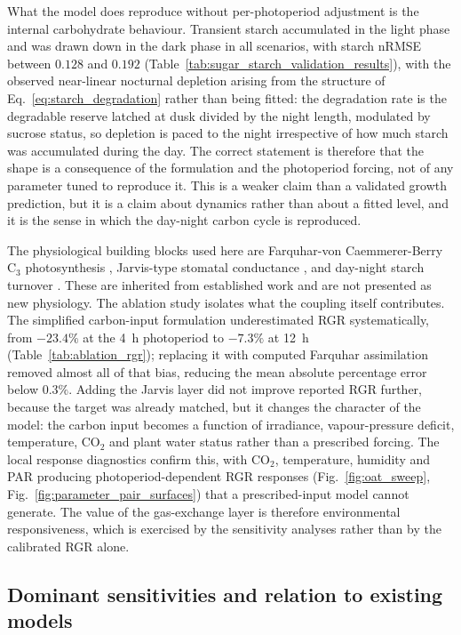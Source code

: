 \documentclass[a4paper,fleqn]{cas-sc}
\begin{document}
What the model does reproduce without per-photoperiod adjustment is the
internal carbohydrate behaviour. Transient starch accumulated in the light
phase and was drawn down in the dark phase in all scenarios, with starch
nRMSE between $0.128$ and $0.192$ (Table~\ref{tab:sugar_starch_validation_results}),
with the observed near-linear nocturnal depletion arising from the structure
of Eq.~\eqref{eq:starch_degradation} rather than being fitted: the
degradation rate is the degradable reserve latched at dusk divided by the
night length, modulated by sucrose status, so depletion is paced to the night
irrespective of how much starch was accumulated during the day. The correct statement is
therefore that the shape is a consequence of the formulation and the
photoperiod forcing, not of any parameter tuned to reproduce it. This is a
weaker claim than a validated growth prediction,
but it is a claim about dynamics rather than about a fitted level, and it is
the sense in which the day-night carbon cycle is reproduced.

The physiological building blocks used here are Farquhar-von Caemmerer-Berry C$_3$ photosynthesis \cite{Farquhar1980}, Jarvis-type stomatal conductance \cite{Jarvis1976}, and day-night starch turnover \cite{Scialdone2013,Stitt2012}. These are inherited from established work and are not presented as new physiology. The ablation study isolates what the coupling itself contributes. The simplified carbon-input formulation underestimated RGR systematically, from $-23.4\%$ at the 4~h photoperiod to $-7.3\%$ at 12~h (Table~\ref{tab:ablation_rgr}); replacing it with computed Farquhar assimilation removed almost all of that bias, reducing the mean absolute percentage error below $0.3\%$. Adding the Jarvis layer did not improve reported RGR further, because the target was already matched, but it changes the character of the model: the carbon input becomes a function of irradiance, vapour-pressure deficit, temperature, CO$_2$ and plant water status rather than a prescribed forcing. The local response diagnostics confirm this, with CO$_2$, temperature, humidity and PAR producing photoperiod-dependent RGR responses (Fig.~\ref{fig:oat_sweep}, Fig.~\ref{fig:parameter_pair_surfaces}) that a prescribed-input model cannot generate. The value of the gas-exchange layer is therefore environmental responsiveness, which is exercised by the sensitivity analyses rather than by the calibrated RGR alone.

\subsection{Dominant sensitivities and relation to existing models}
\end{document}
